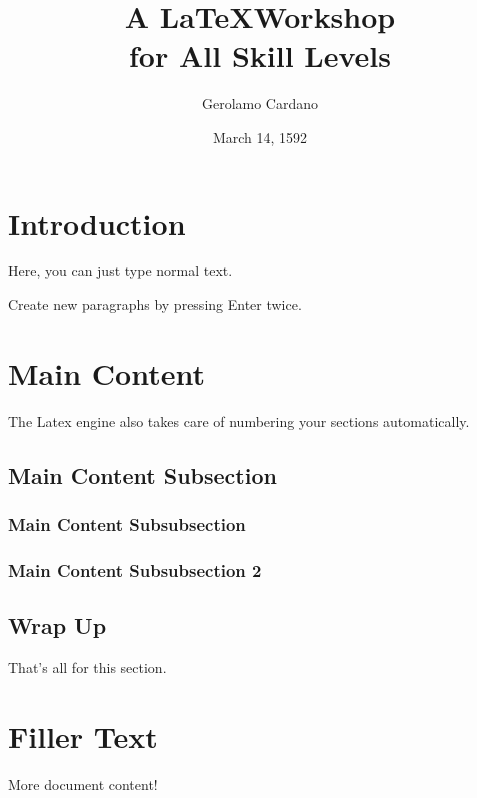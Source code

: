 \documentclass[11pt,twoside,a4paper]{article}
\author{Gerolamo Cardano}
\date{March 14, 1592}
\title{A \LaTeX Workshop \\ for All Skill Levels}
\begin{document}
\tableofcontents

\maketitle

\section{Introduction}
Here, you can just type normal text.

Create new paragraphs by pressing Enter twice.

\section{Main Content}
The Latex engine also takes care of numbering your sections automatically. 

    \subsection{Main Content Subsection}

        \subsubsection{Main Content Subsubsection}

        \subsubsection{Main Content Subsubsection 2}
        
    \subsection{Wrap Up}
    That's all for this section.


\section{Filler Text}
More document content!
\end{document}
